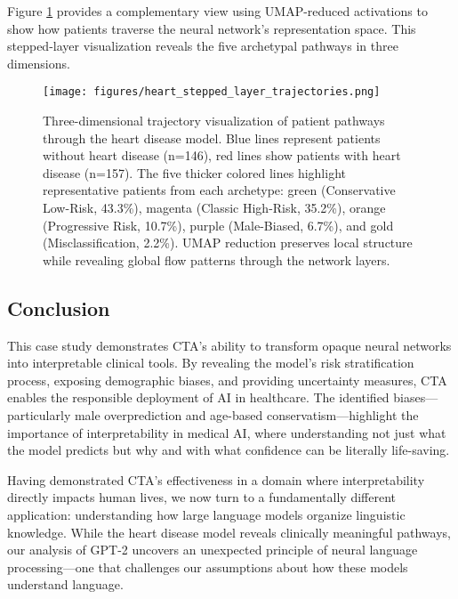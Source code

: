 Figure \ref{fig:heart_trajectories} provides a complementary view using UMAP-reduced activations to show how patients traverse the neural network's representation space. This stepped-layer visualization reveals the five archetypal pathways in three dimensions.

\begin{figure}[ht]
    \centering
    \texttt{[image: figures/heart\_stepped\_layer\_trajectories.png]}
    \caption{Three-dimensional trajectory visualization of patient pathways through the heart disease model. Blue lines represent patients without heart disease (n=146), red lines show patients with heart disease (n=157). The five thicker colored lines highlight representative patients from each archetype: green (Conservative Low-Risk, 43.3\%), magenta (Classic High-Risk, 35.2\%), orange (Progressive Risk, 10.7\%), purple (Male-Biased, 6.7\%), and gold (Misclassification, 2.2\%). UMAP reduction preserves local structure while revealing global flow patterns through the network layers.}
    \label{fig:heart_trajectories}
\end{figure}

\subsection{Conclusion}

This case study demonstrates CTA's ability to transform opaque neural networks into interpretable clinical tools. By revealing the model's risk stratification process, exposing demographic biases, and providing uncertainty measures, CTA enables the responsible deployment of AI in healthcare. The identified biases—particularly male overprediction and age-based conservatism—highlight the importance of interpretability in medical AI, where understanding not just what the model predicts but why and with what confidence can be literally life-saving.

Having demonstrated CTA's effectiveness in a domain where interpretability directly impacts human lives, we now turn to a fundamentally different application: understanding how large language models organize linguistic knowledge. While the heart disease model reveals clinically meaningful pathways, our analysis of GPT-2 uncovers an unexpected principle of neural language processing—one that challenges our assumptions about how these models understand language.